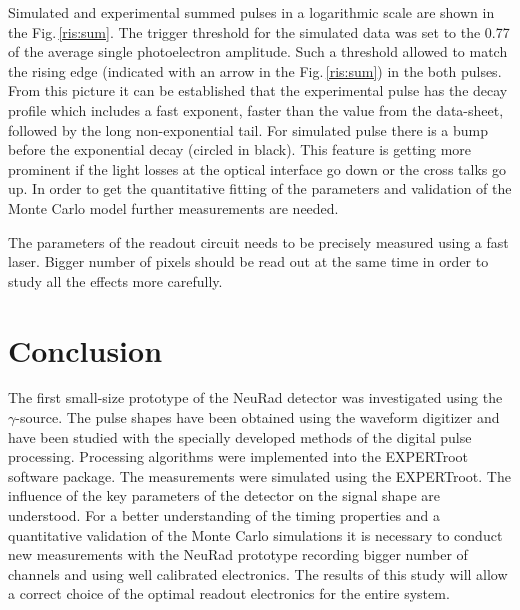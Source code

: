 \documentclass{webofc}
\newcommand{\er}{\textmd{EXPERTroot}}
\begin{document}
Simulated and experimental summed pulses in a logarithmic scale are shown in the Fig.\,\ref{ris:sum}.
The trigger threshold for the simulated data was set to the 0.77 of the average single photoelectron amplitude.
Such a threshold allowed to match the rising edge (indicated with an arrow in the Fig.\,\ref{ris:sum}) in the both pulses. From this picture it can be established that the experimental pulse has the decay profile which includes a fast exponent, faster than the value from the data-sheet, followed by the long non-exponential tail. For simulated pulse there is a bump before the exponential decay (circled in black). This feature is getting more prominent if the light losses at the optical interface go down or the cross talks go up. In order to get the quantitative fitting of the parameters and validation of the Monte Carlo model further measurements are needed. 

The parameters of the readout circuit needs to be precisely measured using a fast laser. Bigger number of pixels should be read out at the same time in order to study all the effects more carefully.


\section{Conclusion}
		
	The first small-size prototype of the NeuRad detector was investigated using the $\gamma$-source. The pulse shapes have been obtained using the waveform digitizer and have been studied with the specially developed methods of the digital pulse processing. Processing algorithms were implemented into the EXPERTroot software package. The measurements were simulated using the \er. The influence of the key parameters of the detector on the signal shape are understood. For a better understanding of the timing properties and a quantitative validation of the Monte Carlo simulations it is necessary to conduct new measurements with the NeuRad prototype recording bigger number of channels and using well calibrated electronics.
	The results of this study will allow a correct choice of the optimal readout electronics for the entire system.
	
	
\end{document}
